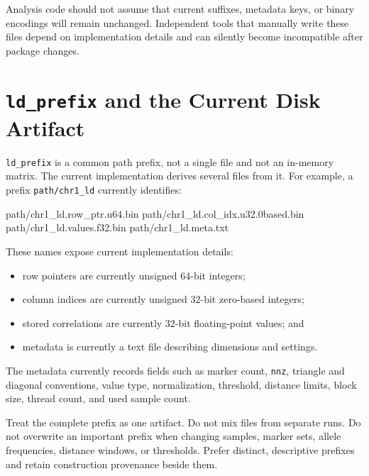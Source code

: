 \documentclass[
  11pt,
  letterpaper,
  DIV=11,
  numbers=noendperiod]{scrartcl}
\newenvironment{Shaded}{\begin{snugshade}}{\end{snugshade}}
\newcommand{\NormalTok}[1]{\textcolor[rgb]{0.12,0.11,0.11}{#1}}
\providecommand{\tightlist}{%
  \setlength{\itemsep}{0pt}\setlength{\parskip}{0pt}}
\begin{document}
Analysis code should not assume that current suffixes, metadata keys, or
binary encodings will remain unchanged. Independent tools that manually
write these files depend on implementation details and can silently
become incompatible after package changes.

\section{\texorpdfstring{\texttt{ld\_prefix} and the Current Disk
Artifact}{ld\_prefix and the Current Disk Artifact}}\label{ld_prefix-and-the-current-disk-artifact}

\texttt{ld\_prefix} is a common path prefix, not a single file and not
an in-memory matrix. The current implementation derives several files
from it. For example, a prefix \texttt{path/chr1\_ld} currently
identifies:

\begin{Shaded}
\begin{Highlighting}[]
\NormalTok{path/chr1\_ld.row\_ptr.u64.bin}
\NormalTok{path/chr1\_ld.col\_idx.u32.0based.bin}
\NormalTok{path/chr1\_ld.values.f32.bin}
\NormalTok{path/chr1\_ld.meta.txt}
\end{Highlighting}
\end{Shaded}

These names expose current implementation details:

\begin{itemize}
\tightlist
\item
  row pointers are currently unsigned 64-bit integers;
\item
  column indices are currently unsigned 32-bit zero-based integers;
\item
  stored correlations are currently 32-bit floating-point values; and
\item
  metadata is currently a text file describing dimensions and settings.
\end{itemize}

The metadata currently records fields such as marker count,
\texttt{nnz}, triangle and diagonal conventions, value type,
normalization, threshold, distance limits, block size, thread count, and
used sample count.

Treat the complete prefix as one artifact. Do not mix files from
separate runs. Do not overwrite an important prefix when changing
samples, marker sets, allele frequencies, distance windows, or
thresholds. Prefer distinct, descriptive prefixes and retain
construction provenance beside them.
\end{document}
